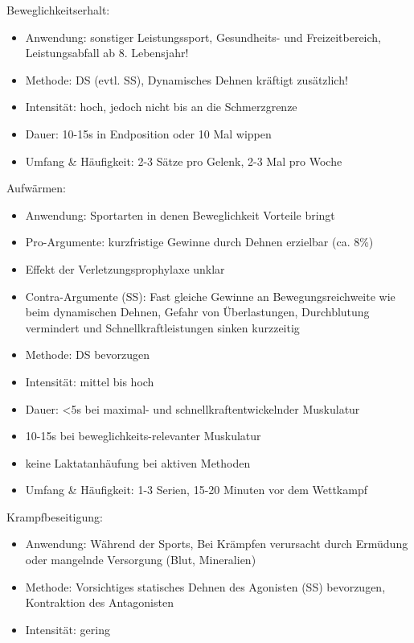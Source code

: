 Beweglichkeitserhalt:
\begin{itemize}
    \item Anwendung: sonstiger Leistungssport, Gesundheits- und Freizeitbereich, Leistungsabfall ab 8. Lebensjahr!
    \item Methode: DS (evtl. SS), Dynamisches Dehnen kräftigt zusätzlich!
    \item Intensität: hoch, jedoch nicht bis an die Schmerzgrenze
    \item Dauer: 10-15s in Endposition oder 10 Mal wippen
    \item Umfang \& Häufigkeit: 2-3 Sätze pro Gelenk, 2-3 Mal pro Woche
\end{itemize}

Aufwärmen:
\begin{itemize}
    \item Anwendung: Sportarten in denen Beweglichkeit Vorteile bringt
    \item Pro-Argumente: kurzfristige Gewinne durch Dehnen erzielbar (ca. 8\%)
    \item Effekt der Verletzungsprophylaxe unklar
    \item Contra-Argumente (SS): Fast gleiche Gewinne an Bewegungsreichweite wie beim dynamischen Dehnen, Gefahr von Überlastungen, Durchblutung vermindert und Schnellkraftleistungen sinken kurzzeitig
    \item Methode: DS bevorzugen
    \item Intensität: mittel bis hoch
    \item Dauer: <5s bei maximal- und schnellkraftentwickelnder Muskulatur
    \item 10-15s bei beweglichkeits-relevanter Muskulatur
    \item keine Laktatanhäufung bei aktiven Methoden
    \item Umfang \& Häufigkeit: 1-3 Serien, 15-20 Minuten vor dem Wettkampf
\end{itemize}

Krampfbeseitigung:
\begin{itemize}
    \item Anwendung: Während der Sports, Bei Krämpfen verursacht durch Ermüdung oder mangelnde Versorgung (Blut, Mineralien)
    \item Methode: Vorsichtiges statisches Dehnen des Agonisten (SS) bevorzugen, Kontraktion des Antagonisten
    \item Intensität: gering
\end{itemize}

